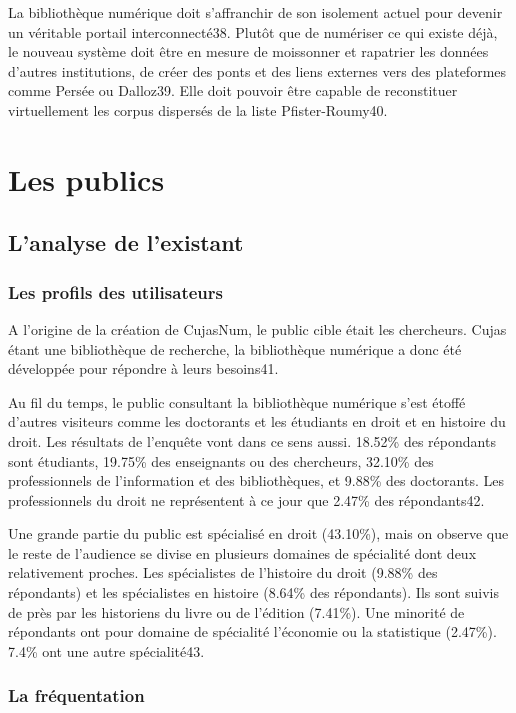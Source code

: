 La bibliothèque numérique doit s’affranchir de son isolement actuel pour devenir un véritable portail interconnecté38. Plutôt que de numériser ce qui existe déjà, le nouveau système doit être en mesure de moissonner et rapatrier les données d’autres institutions, de créer des ponts et des liens externes vers des plateformes comme Persée ou Dalloz39. Elle doit pouvoir être capable de reconstituer virtuellement les corpus dispersés de la liste Pfister-Roumy40.  



\section{Les publics}

\subsection{L’analyse de l’existant} 

\subsubsection{Les profils des utilisateurs}

A l’origine de la création de CujasNum, le public cible était les chercheurs. Cujas étant une bibliothèque de recherche, la bibliothèque numérique a donc été développée pour répondre à leurs besoins41. 

Au fil du temps, le public consultant la bibliothèque numérique s’est étoffé d’autres visiteurs comme les doctorants et les étudiants en droit et en histoire du droit. Les résultats de l’enquête vont dans ce sens aussi. 18.52\% des répondants sont étudiants, 19.75\% des enseignants ou des chercheurs, 32.10\% des professionnels de l’information et des bibliothèques, et 9.88\% des doctorants. Les professionnels du droit ne représentent à ce jour que 2.47\% des répondants42.  

Une grande partie du public est spécialisé en droit (43.10\%), mais on observe que le reste de l’audience se divise en plusieurs domaines de spécialité dont deux relativement proches. Les spécialistes de l’histoire du droit (9.88\% des répondants) et les spécialistes en histoire (8.64\% des répondants). Ils sont suivis de près par les historiens du livre ou de l’édition (7.41\%). Une minorité de répondants ont pour domaine de spécialité l’économie ou la statistique (2.47\%). 7.4\% ont une autre spécialité43. 

\subsubsection{La fréquentation}

